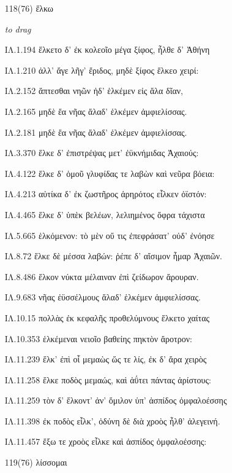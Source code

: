 \begin{enumerate}
{ΙΛ.10.463 πάντων ἀθανάτων ἐπιβωσόμεθ': ἀλλὰ καὶ αὖτις

ΙΛ.10.513 καρπαλίμως δ' ἵππων ἐπεβήσετο: κόψε δ' Ὀδυσσεὺς

ΙΛ.10.529 ἐν χείρεσσ' Ὀδυσῆϊ τίθει, ἐπεβήσετο δ' ἵππων:

}

\clearpage
\item[\large 118(76)]{\large \g ἕλκω}

\hspace{0.2cm} \textit{ to drag }

{\g
ΙΛ.1.194 ἕλκετο δ' ἐκ κολεοῖο μέγα ξίφος, ἦλθε δ' Ἀθήνη

ΙΛ.1.210 ἀλλ' ἄγε λῆγ' ἔριδος, μηδὲ ξίφος ἕλκεο χειρί:

ΙΛ.2.152 ἅπτεσθαι νηῶν ἠδ' ἑλκέμεν εἰς ἅλα δῖαν,

ΙΛ.2.165 μηδὲ ἔα νῆας ἅλαδ' ἑλκέμεν ἀμφιελίσσας.

ΙΛ.2.181 μηδὲ ἔα νῆας ἅλαδ' ἑλκέμεν ἀμφιελίσσας.

ΙΛ.3.370 ἕλκε δ' ἐπιστρέψας μετ' ἐϋκνήμιδας Ἀχαιούς:

ΙΛ.4.122 ἕλκε δ' ὁμοῦ γλυφίδας τε λαβὼν καὶ νεῦρα βόεια:

ΙΛ.4.213 αὐτίκα δ' ἐκ ζωστῆρος ἀρηρότος εἷλκεν ὀϊστόν:

ΙΛ.4.465 ἕλκε δ' ὑπὲκ βελέων, λελιημένος ὄφρα τάχιστα

ΙΛ.5.665 ἑλκόμενον: τὸ μὲν οὔ τις ἐπεφράσατ' οὐδ' ἐνόησε

ΙΛ.8.72 ἕλκε δὲ μέσσα λαβών: ῥέπε δ' αἴσιμον ἦμαρ Ἀχαιῶν.

ΙΛ.8.486 ἕλκον νύκτα μέλαιναν ἐπὶ ζείδωρον ἄρουραν.

ΙΛ.9.683 νῆας ἐϋσσέλμους ἅλαδ' ἑλκέμεν ἀμφιελίσσας.

ΙΛ.10.15 πολλὰς ἐκ κεφαλῆς προθελύμνους ἕλκετο χαίτας

ΙΛ.10.353 ἑλκέμεναι νειοῖο βαθείης πηκτὸν ἄροτρον:

ΙΛ.11.239 ἕλκ' ἐπὶ οἷ μεμαὼς ὥς τε λίς, ἐκ δ' ἄρα χειρὸς

ΙΛ.11.258 ἕλκε ποδὸς μεμαώς, καὶ ἀΰτει πάντας ἀρίστους:

ΙΛ.11.259 τὸν δ' ἕλκοντ' ἀν' ὅμιλον ὑπ' ἀσπίδος ὀμφαλοέσσης

ΙΛ.11.398 ἐκ ποδὸς εἷλκ', ὀδύνη δὲ διὰ χροὸς ἦλθ' ἀλεγεινή.

ΙΛ.11.457 ἔξω τε χροὸς εἷλκε καὶ ἀσπίδος ὀμφαλοέσσης:

}

\clearpage
\item[\large 119(76)]{\large \g λίσσομαι}


\end{enumerate}

